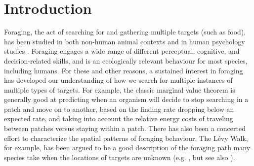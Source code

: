 \documentclass[vision,article,submit,pdftex,moreauthors]{Definitions/mdpi}
\begin{document}



\section{Introduction}

Foraging, the act of searching for and gathering multiple targets (such as food), has been studied in both non-human animal contexts \cite{dawkins1971} and in human psychology studies \cite{kristjansson2014}. Foraging engages a wide range of different perceptual, cognitive, and decision-related skills, and is an ecologically relevant behaviour for most species, including humans. For these and other reasons, a sustained interest in foraging has developed our understanding of how we search for multiple instances of multiple types of targets. For example, the classic marginal value theorem \cite {charnov1976} is generally good at predicting when an organism will decide to stop searching in a patch and move on to another, based on the finding rate dropping below an expected rate, and taking into account the relative energy costs of traveling between patches versus staying within a patch. There has also been a concerted effort to characterize the spatial patterns of foraging behaviour. The Lévy Walk, for example, has been argued to be a good description of the foraging path many species take when the locations of targets are unknown (e.g. \citep {bartumeus2005}, but see also \citep{benhamou2007}). 
\end{document}
